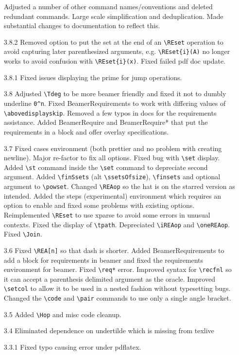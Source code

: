\documentclass[leqno,11pt]{amsart}
\begin{document}
\begin{itemize}
	Adjusted a number of other command names/conventions and deleted redundant commands.  Large scale simplification and deduplication.  Made substantial changes to documentation to reflect this.
	\item[3.8.2] Removed option to put the set at the end of an \verb=\REset= operation to avoid capturing later parenthesized arguments, e.g. \verb=\REset{i}(A)= no longer works to avoid confusion with \verb=\REset{i}(x)=.  Fixed failed pdf doc update.
	\item[3.8.1] Fixed issues displaying the prime for jump operations.
	\item[3.8] Adjusted \verb=\Tdeg= to be more beamer friendly and fixed it not to dumbly underline \verb=0^n=.  Fixed BeamerRequirements to work with differing values of \verb=\abovedisplayskip=.  Removed a few typos in docs for the requirements assistance.  Added BeamerRequire and BeamerRequire* that put the requirements in a block and offer overlay specifications.
	\item[3.7] Fixed cases environment (both prettier and no problem with creating newline).  Major re-factor to fix all options.  Fixed bug with \verb=\set= display.  Added \verb=\st= command inside the \verb=\set= command to depreciate second argument.  Added \verb=\finSsets= (alt \verb=\ssetsOfsize=), \verb=\finsets= and optional argument to \verb=\powset=.  Changed \verb=\REAop= so the hat is on the starred version as intended.  Added the steps (experimental) environment which requires an option to enable and fixed some problems with existing options.  Reimplemented \verb=\REset= to use xparse to avoid some errors in unusual contexts.  Fixed the display of \verb=\tpath=.   Depreciated \verb=\iREAop= and \verb=\oneREAop=.  Fixed \verb=\Join=.
	\item[3.6] Fixed \verb=\REA[n]= so that dash is shorter.  Added BeamerRequirements to add a block for requirements in beamer and fixed the requirements environment for beamer.  Fixed \verb=\req*= error.  Improved syntax for \verb=\recfnl= so it can accept a parenthesis delimited argument as the oracle.  Improved \verb=\setcol= to allow it to be used in a nested fashion without typesetting bugs.  Changed the \verb=\code= and \verb=\pair= commands to use only a single angle bracket.
	\item[3.5] Added \verb=\Hop= and misc code cleanup.
	\item[3.4] Eliminated dependence on undertilde which is missing from texlive
	\item[3.3.1] Fixed typo causing error under pdflatex.

\end{itemize}
\end{document}

